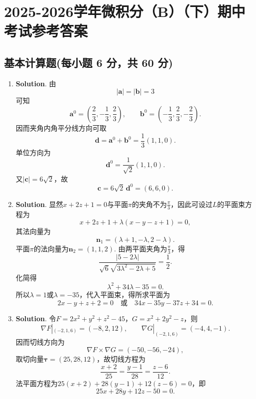 \documentclass[../main.tex]{subfiles}
\begin{document}
\chapter{2025-2026学年微积分（B）（下）期中考试参考答案}
\section{基本计算题(每小题 6 分，共 60 分)}
\begin{enumerate}
    \item \textbf{Solution}. 由
          \[
              |\boldsymbol{a}|=|\boldsymbol{b}|=3
          \]
          可知
          \[
              \boldsymbol{a}^0=\left(\frac23,-\frac13,\frac23\right),\qquad
              \boldsymbol{b}^0=\left(-\frac13,\frac23,-\frac23\right).
          \]
          因而夹角内角平分线方向可取
          \[
              \boldsymbol{d}=\boldsymbol{a}^0+\boldsymbol{b}^0=\frac13(1,1,0).
          \]
          单位方向为
          \[
              \boldsymbol{d}^0=\frac{1}{\sqrt2}(1,1,0).
          \]
          又$|\boldsymbol{c}|=6\sqrt2$，故
          \[
              \boldsymbol{c}=6\sqrt2\,\boldsymbol{d}^0=(6,6,0).
          \]

    \item \textbf{Solution}. 显然$x+2z+1=0$与平面$\pi$的夹角不为$\frac{\pi}{3}$，因此可设过$L$的平面束方程为
          \[
              x+2z+1+\lambda(x-y-z+1)=0,
          \]
          其法向量为
          \[
              \boldsymbol{n}_1=(\lambda+1,-\lambda,2-\lambda).
          \]
          平面$\pi$的法向量为$\boldsymbol{n}_2=(1,1,2)$. 由两平面夹角为$\frac{\pi}{3}$，得
          \[
              \frac{|5-2\lambda|}{\sqrt6\sqrt{3\lambda^2-2\lambda+5}}=\frac12.
          \]
          化简得
          \[
              \lambda^2+34\lambda-35=0.
          \]
          所以$\lambda=1$或$\lambda=-35$，代入平面束，得所求平面为
          \[
              2x-y+z+2=0\quad\text{或}\quad 34x-35y-37z+34=0.
          \]

    \item \textbf{Solution}. 令$F=2x^2+y^2+z^2-45$，$G=x^2+2y^2-z$，则
          \[
              \nabla F|_{(-2,1,6)}=(-8,2,12),\qquad
              \nabla G|_{(-2,1,6)}=(-4,4,-1).
          \]
          因而切线方向为
          \[
              \nabla F\times\nabla G=(-50,-56,-24),
          \]
          取切向量$\boldsymbol{\tau} = (25,28,12)$，故切线方程为
          \[
              \frac{x+2}{25}=\frac{y-1}{28}=\frac{z-6}{12}.
          \]
          法平面方程为$25(x+2)+28(y-1)+12(z-6)=0$，即
          \[
              25x+28y+12z-50=0.
          \]


\end{enumerate}
\end{document}
